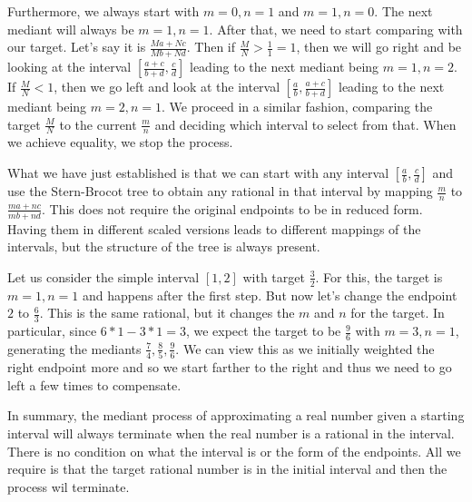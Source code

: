 \documentclass[12pt]{article}
\theoremstyle{remark}
\begin{document}
Furthermore, we always start with $m=0, n=1$ and $m=1, n=0$. The next mediant will always be $m=1, n=1$. After that, we need to start comparing with our target. Let's say it is $\frac{Ma + Nc}{Mb + Nd}$. Then if $\frac{M}{N} > \frac{1}{1} = 1$, then we will go right and be looking at the interval $[\frac{a+c}{b+d}, \frac{c}{d}]$ leading to the next mediant being $m=1, n=2$. If $\frac{M}{N} < 1$, then we go left and look at the interval $[\frac{a}{b}, \frac{a+c}{b+d}]$ leading to the next mediant being $m=2, n=1$. We proceed in a similar fashion, comparing the target $\frac{M}{N}$ to the current $\frac{m}{n}$ and deciding which interval to select from that. When we achieve equality, we stop the process.

What we have just established is that we can start with any interval $[\frac{a}{b}, \frac{c}{d}]$ and use the Stern-Brocot tree to obtain any rational in that interval by mapping $\frac{m}{n}$ to $\frac{ma + nc}{mb + nd}$. This does not require the original endpoints to be in reduced form. Having them in different scaled versions leads to different mappings of the intervals, but the structure of the tree is always present. 

Let us consider the simple interval $[1, 2]$ with target $\frac{3}{2}$. For this, the target is $m=1, n=1$ and happens after the first step. But now let's change the endpoint $2$ to $\frac{6}{3}$. This is the same rational, but it changes the $m$ and $n$ for the target. In particular, since $6*1-3*1 = 3$, we expect the target to be $\frac{9}{6}$ with $m=3, n=1$, generating the mediants $\frac{7}{4}, \frac{8}{5}, \frac{9}{6}$.  We can view this as we initially weighted the right endpoint more and so we start farther to the right and thus we need to go left a few times to compensate. 

In summary, the mediant process of approximating a real number given a starting interval will always terminate when the real number is a rational in the interval. There is no condition on what the interval is or the form of the endpoints. All we require is that the target rational number is in the initial interval and then the process wil terminate.


\medskip

\printbibliography
\end{document}
